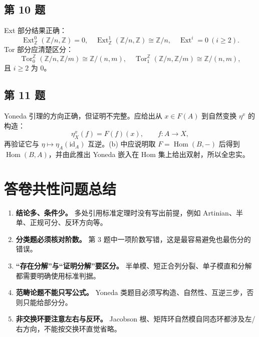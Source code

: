 \documentclass[11pt]{article}
\begin{document}
\subsection*{第 10 题}

Ext 部分结果正确：
\[
  \operatorname{Ext}^0_{\mathbb Z}(\mathbb Z/n,\mathbb Z)=0,\quad
  \operatorname{Ext}^1_{\mathbb Z}(\mathbb Z/n,\mathbb Z)\cong\mathbb Z/n,\quad
  \operatorname{Ext}^i=0\ (i\ge2).
\]
Tor 部分应清楚区分：
\[
  \operatorname{Tor}_0^{\mathbb Z}(\mathbb Z/n,\mathbb Z/m)\cong \mathbb Z/(n,m),
  \quad
  \operatorname{Tor}_1^{\mathbb Z}(\mathbb Z/n,\mathbb Z/m)\cong \mathbb Z/(n,m),
\]
且 \(i\ge2\) 为 \(0\)。

\subsection*{第 11 题}

Yoneda 引理的方向正确，但证明不完整。应给出从 \(x\in F(A)\) 到自然变换 \(\eta^x\) 的构造：
\[
  \eta^x_X(f)=F(f)(x),\qquad f:A\to X,
\]
再验证它与 \(\eta\mapsto \eta_A(\mathrm{id}_A)\) 互逆。(b) 中应说明取 \(F=\operatorname{Hom}(B,-)\) 后得到 \(\operatorname{Hom}(B,A)\)，并由此推出 Yoneda 嵌入在 Hom 集上给出双射，所以全忠实。

\section*{答卷共性问题总结}

\begin{enumerate}
  \item \textbf{结论多、条件少。} 多处引用标准定理时没有写出前提，例如 Artinian、半单、正规可分、反环方向等。
  \item \textbf{分类题必须核对阶数。} 第 3 题中一项阶数写错，这是最容易避免也最伤分的错误。
  \item \textbf{“存在分解”与“证明分解”要区分。} 半单模、短正合列分裂、单子模直和分解都需要明确使用标准判据。
  \item \textbf{范畴论题不能只写公式。} Yoneda 类题目必须写构造、自然性、互逆三步，否则只能给部分分。
  \item \textbf{非交换环要注意左右与反环。} Jacobson 根、矩阵环自然模自同态环都涉及左/右方向，不能按交换环直觉省略。
\end{enumerate}
\end{document}
